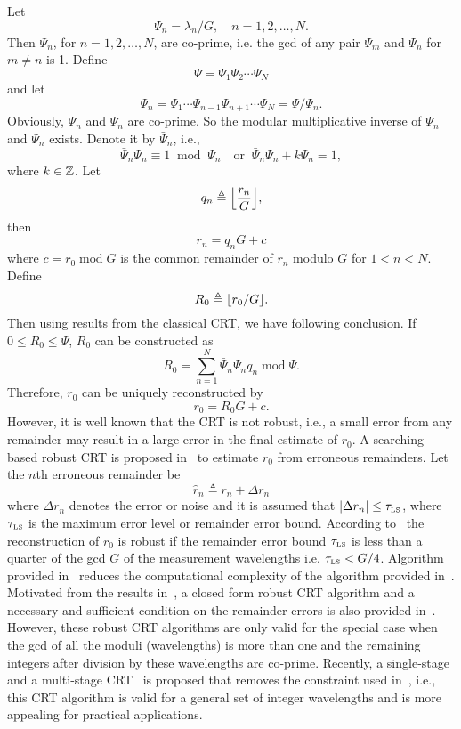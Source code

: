 Let
\[
\Psi_n = \lambda_n/G, \quad n=1,2,\ldots,N.
\]
Then $\Psi_n$, for $n=1,2,\ldots,N$, are co-prime, i.e. the gcd of any pair $\Psi_m$ and $\Psi_n$ for $m\neq n$ is 1. Define 
\[
\Psi = \Psi_1\Psi_2 \cdots \Psi_N
\]
and let
\[
\Psi_n = \Psi_1 \cdots \Psi_{n-1} \Psi_{n+1} \cdots \Psi_N = \Psi/\Psi_n.
\]
Obviously, $\Psi_n$ and $\Psi_n$ are co-prime. So the modular multiplicative inverse of $\Psi_n$ and $\Psi_n$ exists. Denote it by $\bar{\Psi}_n$, i.e., 
\[
\bar{\Psi}_n \Psi_n \equiv 1 \;\; \text{mod} \;\; \Psi_n  \quad \text{or} \;\; \bar{\Psi}_n \Psi_n + k\Psi_n =1, 
\]
where $k \in {\mathbb Z}$. Let 
\[
q_n \triangleq {\left\lfloor \frac{r_n}{G} \right\rfloor},
\] 
then
\[
r_n = q_n G + c
\]
where $c = r_0\; \text{mod}\; G$ is the common remainder of $r_n$ modulo $G$ for $1<n<N$. Define
\[
R_0  \triangleq {\left\lfloor r_0/G \right\rfloor}.
\]
Then using results from the classical CRT, we have following conclusion. If $0 \leq R_0 \leq \Psi$, $R_0$ can be constructed as
\[
R_0 = \sum_{n=1}^N \bar{\Psi}_n \Psi_n q_n \; \text{mod} \; \Psi.
\]
Therefore, $r_0$ can be uniquely reconstructed by
\[
r_0 = R_0G + c.
\]
However, it is well known that the CRT is not robust, i.e., a small error from any remainder may result in a large error in the final estimate of $r_0$. A searching based robust CRT is proposed in~\cite{XiaoweiLi2010, Xia2007} to estimate $r_0$ from erroneous remainders. Let the $n$th erroneous remainder be
\[
\hat{r}_n \triangleq r_n + \Delta r_n 
\]
where $\Delta r_n$ denotes the error or noise and it is assumed that $|\Delta r_n | \leq \tau_{\text{\tiny{LS}}}$, where $\tau_{\text{\tiny{LS}}}$ is the maximum error level or remainder error bound. According to~\cite{Xia2007} the reconstruction of $r_0$ is robust if the remainder error bound $\tau_{\text{\tiny{LS}}}$ is less than a quarter of the gcd $G$ of the measurement wavelengths i.e. $\tau_{\text{\tiny{LS}}} < G/4$. Algorithm provided in~\cite{Xiaowei_Li_robust_CRT_2009} reduces the computational complexity of the algorithm provided in~\cite{Xia2007}. Motivated from the results in~\cite{Xia2007, Xiaowei_Li_robust_CRT_2009}, a closed form robust CRT algorithm and a necessary and sufficient condition on the remainder errors is also provided in~\cite{W.Wang_closed_form_crt_2010}. However, these robust CRT algorithms are only valid for the special case when the gcd of all the moduli (wavelengths) is more than one and the remaining integers after division by these wavelengths are co-prime. Recently, a single-stage and a multi-stage CRT~\cite{Xiao_multistage_crt_2014} is proposed that removes the constraint used in~\cite{Xia2007, Xiaowei_Li_robust_CRT_2009, W.Wang_closed_form_crt_2010}, i.e., this CRT algorithm is valid for a general set of integer wavelengths and is more appealing for practical applications. 




